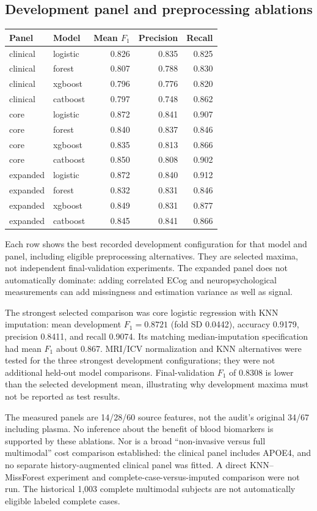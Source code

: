 \documentclass[11pt,a4paper]{article}
\begin{document}
\subsection{Development panel and preprocessing ablations}
\begin{center}\small
\begin{tabular}{llrrr}\hline
Panel & Model & Mean $F_1$ & Precision & Recall\\\hline
clinical & logistic & 0.826 & 0.835 & 0.825\\
clinical & forest & 0.807 & 0.788 & 0.830\\
clinical & xgboost & 0.796 & 0.776 & 0.820\\
clinical & catboost & 0.797 & 0.748 & 0.862\\
core & logistic & 0.872 & 0.841 & 0.907\\
core & forest & 0.840 & 0.837 & 0.846\\
core & xgboost & 0.835 & 0.813 & 0.866\\
core & catboost & 0.850 & 0.808 & 0.902\\
expanded & logistic & 0.872 & 0.840 & 0.912\\
expanded & forest & 0.832 & 0.831 & 0.846\\
expanded & xgboost & 0.849 & 0.831 & 0.877\\
expanded & catboost & 0.845 & 0.841 & 0.866\\
\hline\end{tabular}\end{center}
Each row shows the best recorded development configuration for that model and panel, including eligible preprocessing alternatives. They are selected maxima, not independent final-validation experiments. The expanded panel does not automatically dominate: adding correlated ECog and neuropsychological measurements can add missingness and estimation variance as well as signal.

The strongest selected comparison was core logistic regression with KNN imputation: mean development $F_1=0.8721$ (fold SD 0.0442), accuracy 0.9179, precision 0.8411, and recall 0.9074. Its matching median-imputation specification had mean $F_1$ about 0.867. MRI/ICV normalization and KNN alternatives were tested for the three strongest development configurations; they were not additional held-out model comparisons. Final-validation $F_1$ of 0.8308 is lower than the selected development mean, illustrating why development maxima must not be reported as test results.

The measured panels are 14/28/60 source features, not the audit's original 34/67 including plasma. No inference about the benefit of blood biomarkers is supported by these ablations. Nor is a broad ``non-invasive versus full multimodal'' cost comparison established: the clinical panel includes APOE4, and no separate history-augmented clinical panel was fitted. A direct KNN--MissForest experiment and complete-case-versus-imputed comparison were not run. The historical 1,003 complete multimodal subjects are not automatically eligible labeled complete cases.
\end{document}
